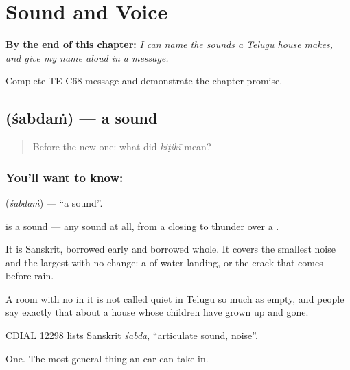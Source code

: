 
\chapter{Sound and Voice}
\label{ch:te-sound-and-voice}

\begin{chapteropening}
\textbf{By the end of this chapter:} \emph{I can name the sounds a Telugu house makes, and give my name aloud in a message.}

Complete TE-C68-message and demonstrate the chapter promise.
\end{chapteropening}

\section[\texorpdfstring{\te{శబ్దం} (śabdaṁ)}{శబ్దం (śabdaṁ)}]{ (śabdaṁ) — a sound}

\label{lesson:TE-C68-sound}



\begin{quote}
Before the new one: what did \emph{kiṭikī} mean?
\end{quote}

\subsection*{You'll want to know: }
\textbf{} (\emph{śabdaṁ}) — \textquotedblleft{}a sound\textquotedblright{}.

 is a sound — any sound at all, from a  closing to thunder over a .

It is Sanskrit, borrowed early and borrowed whole. It covers the smallest noise and the largest with no change: a  of water landing, or the crack that comes before rain.

A room with no  in it is not called quiet in Telugu so much as empty, and people say exactly that about a house whose children have grown up and gone.

CDIAL 12298 lists Sanskrit \emph{śabda}, \textquotedblleft{}articulate sound, noise\textquotedblright{}.

\begin{grammarlens}[title={What you've built}]
One. The most general thing an ear can take in.
\end{grammarlens}

